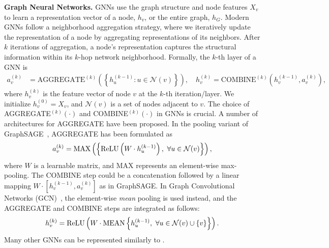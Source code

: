 {\bf Graph Neural Networks.}  GNNs use the graph structure and node features $X_v$ to learn a representation vector of a node, $h_v$, or the entire graph, $h_G$.
Modern GNNs follow a 
neighborhood aggregation strategy, where we iteratively update the representation of a node by aggregating representations of its neighbors. After $k$ iterations of aggregation, a node's representation captures the structural information within its $k$-hop network neighborhood. Formally, the $k$-th layer of a GNN is 
\begin{align}
                \label{eq:combine}      
    a_v^{(k)} & = \text{AGGREGATE}^{(k)} \left( \left\lbrace h_u^{(k-1)}  : u \in \mathcal{N}(v) \right\rbrace \right), \quad  %
    h_v^{(k)}   = \text{COMBINE}^{(k)} \left( h_v^{(k-1)}, a_v^{(k)} \right),
\end{align}
where $h_v^{(k)}$ is the feature vector of node $v$ at the $k$-th iteration/layer. We initialize $h_v^{(0)} = X_v$, and $\mathcal{N}(v)$ is a set of nodes adjacent to $v$. 
%
The choice of AGGREGATE$^{(k)} (\cdot)$ and COMBINE$^{(k)} (\cdot)$ in GNNs is crucial. A number of architectures for AGGREGATE have been proposed. 
In the pooling variant of GraphSAGE~\citep{hamilton2017inductive}, AGGREGATE has been formulated as
\begin{align} \label{eq:graphsage-agg}
    a_v^{(k)} =   {\rm MAX}\left( \left\{ {\rm ReLU} \left(W \cdot h_u^{(k-1)} \right), \  \forall u \in \mathcal{N}(v) \right\}\right),
\end{align} 
where $W$ is a learnable matrix, and MAX represents an element-wise max-pooling.
The COMBINE step could be a concatenation followed by a linear mapping $W \cdot \left[ h_v^{(k-1)}, a_v^{(k)}  \right]$ as in GraphSAGE. 
In Graph Convolutional Networks (GCN)~\citep{kipf2016semi}, the element-wise \emph{mean} pooling is used instead, and the AGGREGATE and COMBINE steps are integrated as follows: 
\begin{align} \label{eq:gcn-agg}
h_v^{(k)} =   {\rm ReLU} \left(W \cdot {\rm MEAN} \left\{h_u^{(k-1)},\ \forall u \in \mathcal{N}(v) \cup \{v\} \right\} \right).
\end{align}
Many other GNNs can be represented similarly to  \citep{xu2018representation, gilmer2017neural}.

